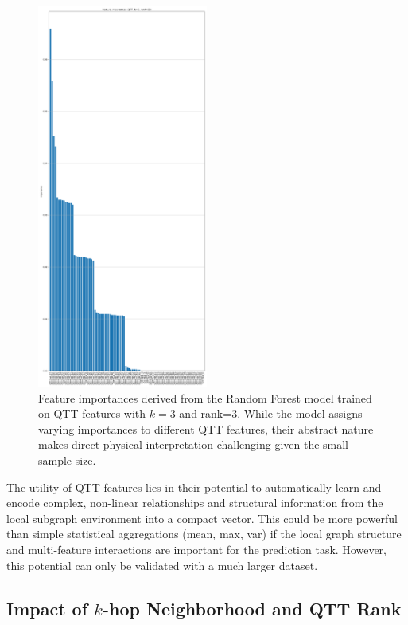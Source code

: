 \documentclass[twocolumn]{aastex631}
\begin{document}
\begin{figure}[h!]
    \centering
    \includegraphics[width=0.5\textwidth]{../input_files/plots/feature_importances_qtt_k3_r3_21_20250524-175150.png}
    \caption{Feature importances derived from the Random Forest model trained on QTT features with $k=3$ and rank=3. While the model assigns varying importances to different QTT features, their abstract nature makes direct physical interpretation challenging given the small sample size.
}
    \label{fig:feature_importances_qtt_k3_r3}
\end{figure}

The utility of QTT features lies in their potential to automatically learn and encode complex, non-linear relationships and structural information from the local subgraph environment into a compact vector. This could be more powerful than simple statistical aggregations (mean, max, var) if the local graph structure and multi-feature interactions are important for the prediction task. However, this potential can only be validated with a much larger dataset.

\subsection{Impact of $k$-hop Neighborhood and QTT Rank}
\end{document}
